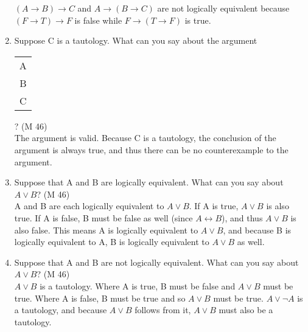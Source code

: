 \documentclass{article}
\begin{document}
\begin{enumerate}
          $(A \to B) \to C$ and $A \to (B \to C)$ are not logically equivalent because $(F \to T) \to F$ is false while $F \to (T \to F)$ is true.
    \item Suppose C is a tautology. What can you say about the argument \begin{tabular}{c}A\\B\\\hline C\end{tabular}? (M 46)\\
          The argument is valid. Because C is a tautology, the conclusion of the argument is always true, and thus there can be no counterexample to the argument.
    \item Suppose that A and B are logically equivalent. What can you say about $A \lor B$? (M 46)\\
          A and B are each logically equivalent to $A \lor B$. If A is true, $A \lor B$ is also true. If A is false, B must be false as well (since $A \leftrightarrow B$), and thus $A \lor B$ is also false. This means A is logically equivalent to $A \lor B$, and because B is logically equivalent to A, B is logically equivalent to $A \lor B$ as well.
    \item Suppose that A and B are not logically equivalent. What can you say about $A \lor B$? (M 46)\\
          $A \lor B$ is a tautology. Where A is true, B must be false and $A \lor B$ must be true. Where A is false, B must be true and so $A \lor B$ must be true. $A \lor \neg A$ is a tautology, and because $A \lor B$ follows from it, $A \lor B$ must also be a tautology.
\end{enumerate}
\end{document}
